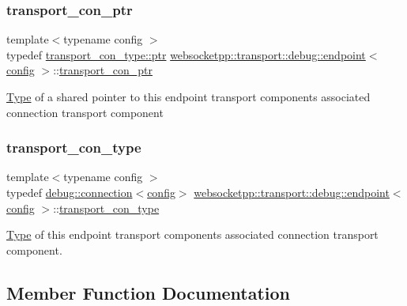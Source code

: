 \subsubsection{\texorpdfstring{transport\+\_\+con\+\_\+ptr}{transport\_con\_ptr}}
{\footnotesize\ttfamily template$<$typename config $>$ \\
typedef \mbox{\hyperlink{classwebsocketpp_1_1transport_1_1debug_1_1connection_a40631f93557c3308c2c8c7897e6a4825}{transport\+\_\+con\+\_\+type\+::ptr}} \mbox{\hyperlink{classwebsocketpp_1_1transport_1_1debug_1_1endpoint}{websocketpp\+::transport\+::debug\+::endpoint}}$<$ \mbox{\hyperlink{classconfig}{config}} $>$\+::\mbox{\hyperlink{classwebsocketpp_1_1transport_1_1debug_1_1endpoint_ab261a090fca072aea9b5dba04aba4c6d}{transport\+\_\+con\+\_\+ptr}}}

\mbox{\hyperlink{struct_type}{Type}} of a shared pointer to this endpoint transport component\textquotesingle{}s associated connection transport component \mbox{\label{classwebsocketpp_1_1transport_1_1debug_1_1endpoint_a267bc670b0cecf80aa39ee266785e9ba}} 
\subsubsection{\texorpdfstring{transport\+\_\+con\+\_\+type}{transport\_con\_type}}
{\footnotesize\ttfamily template$<$typename config $>$ \\
typedef \mbox{\hyperlink{classwebsocketpp_1_1transport_1_1debug_1_1connection}{debug\+::connection}}$<$\mbox{\hyperlink{classconfig}{config}}$>$ \mbox{\hyperlink{classwebsocketpp_1_1transport_1_1debug_1_1endpoint}{websocketpp\+::transport\+::debug\+::endpoint}}$<$ \mbox{\hyperlink{classconfig}{config}} $>$\+::\mbox{\hyperlink{classwebsocketpp_1_1transport_1_1debug_1_1endpoint_a267bc670b0cecf80aa39ee266785e9ba}{transport\+\_\+con\+\_\+type}}}

\mbox{\hyperlink{struct_type}{Type}} of this endpoint transport component\textquotesingle{}s associated connection transport component. 

\subsection{Member Function Documentation}
\mbox{\label{classwebsocketpp_1_1transport_1_1debug_1_1endpoint_a8b5c3265ebf3bf68af57f2d770950edb}} 
